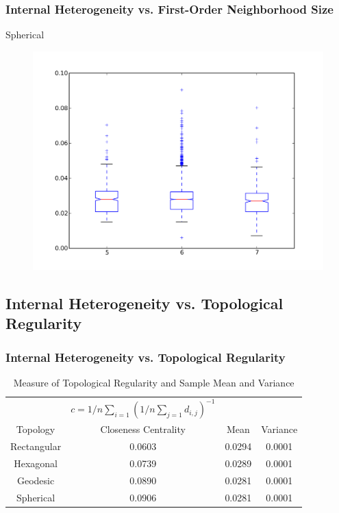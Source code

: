 \documentclass[nototal,handout]{beamer}
\begin{document}
\begin{frame}
	\frametitle{Internal Heterogeneity vs. First-Order Neighborhood Size}
 
\begin{block}{Spherical}
  \begin{center}
  \begin{figure}
  \includegraphics[width=0.75\linewidth]{graph_iv_box.png}
  \end{figure}
  \end{center}
 \end{block} \end{frame} 

\subsection{Internal Heterogeneity vs. Topological Regularity} 

\begin{frame}
	\frametitle{Internal Heterogeneity vs. Topological Regularity}
  \begin{table}
  \centering
  \begin{minipage}{\textwidth}
  \caption{Measure of Topological Regularity and Sample Mean and Variance}
  \label{vardeg}
  \begin{tabular}{|c||c|c|c|}
  \hline
  &$c=1/n \sum_{i=1} (1/n \sum_{j=1} d_{i,j})^{-1}$&&\\
  Topology & Closeness Centrality & Mean & Variance\\
  \hline
  Rectangular & 0.0603 & 0.0294 &0.0001\\
  Hexagonal & 0.0739 & 0.0289 &0.0001\\
  Geodesic & 0.0890 & 0.0281 &0.0001\\
  Spherical & 0.0906 & 0.0281 &0.0001\\
  \hline
  \end{tabular}
  \end{minipage}
  \end{table}
 \end{frame} 
\end{document}
